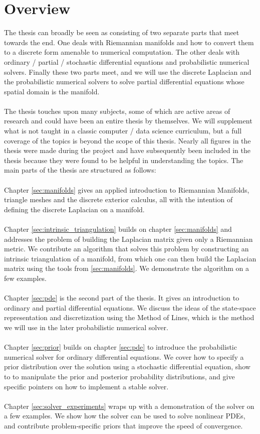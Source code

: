 \section{Overview}\label{sec:overview}
The thesis can broadly be seen as consisting of two separate parts that meet towards the end. One deals with Riemannian manifolds and how to convert them to a discrete form amenable to numerical computation. The other deals with ordinary / partial / stochastic differential equations and probabilistic numerical solvers. Finally these two parts meet, and we will use the discrete Laplacian and the probabilistic numerical solvers to solve partial differential equations whose spatial domain is the manifold.
\\\\
The thesis touches upon many subjects, some of which are active areas of research and could have been an entire thesis by themselves. We will supplement what is not taught in a classic computer / data science curriculum, but a full coverage of the topics is beyond the scope of this thesis. Nearly all figures in the thesis were made during the project and have subsequently been included in the thesis because they were found to be helpful in understanding the topics. The main parts of the thesis are structured as follows:
\\\\
Chapter \ref{sec:manifolds} gives an applied introduction to Riemannian Manifolds, triangle meshes and the discrete exterior calculus, all with the intention of defining the discrete Laplacian on a manifold.
\\\\
Chapter \ref{sec:intrinsic_triangulation} builds on chapter \ref{sec:manifolds} and addresses the problem of building the Laplacian matrix given only a Riemannian metric. We contribute an algorithm that solves this problem by constructing an intrinsic triangulation of a manifold, from which one can then build the Laplacian matrix using the tools from \ref{sec:manifolds}. We demonstrate the algorithm on a few examples.
\\\\
Chapter \ref{sec:pde} is the second part of the thesis. It gives an introduction to ordinary and partial differential equations. We discuss the ideas of the state-space representation and discretization using the Method of Lines, which is the method we will use in the later probabilistic numerical solver.
\\\\
Chapter \ref{sec:prior} builds on chapter \ref{sec:pde} to introduce the probabilistic numerical solver for ordinary differential equations. We cover how to specify a prior distribution over the solution using a stochastic differential equation, show to to manipulate the prior and posterior probability distributions, and give specific pointers on how to implement a stable solver.
\\\\
Chapter \ref{sec:solver_experiments} wraps up with a demonstration of the solver on a few examples. We show how the solver can be used to solve nonlinear PDEs, and contribute problem-specific priors that improve the speed of convergence.

